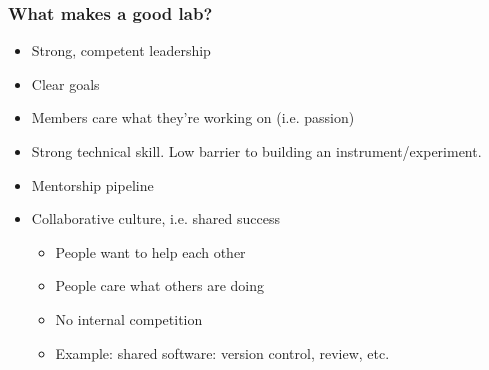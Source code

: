 \begin{frame}
\frametitle{What makes a good lab?}
\begin{itemize}
  \item Strong, competent leadership
  \item Clear goals
  \item Members care what they're working on (i.e. passion)
  \item Strong technical skill. Low barrier to building an instrument/experiment.
  \item Mentorship pipeline
  \item Collaborative culture, i.e. shared success
    \begin{itemize}
      \item People want to help each other
      \item People care what others are doing
      \item No internal competition
      \item Example: shared software: version control, review, etc.
    \end{itemize}
\end{itemize}
\end{frame}
